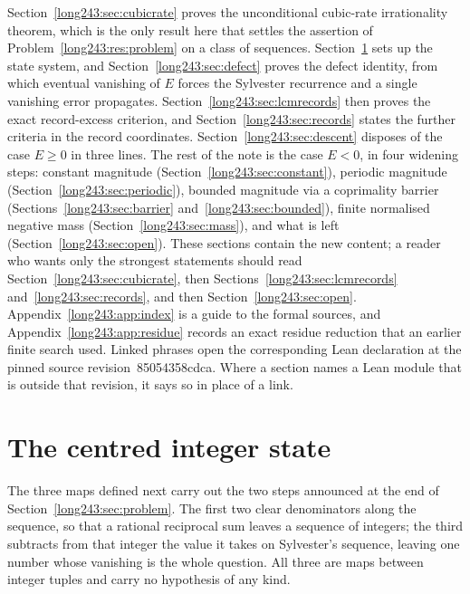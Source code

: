 \documentclass[11pt]{article}
\renewcommand{\commitshort}{85054358cdca}
\begin{document}
Section~\ref{long243:sec:cubicrate} proves the unconditional cubic-rate irrationality
theorem, which is the only result here that settles the assertion of
Problem~\ref{long243:res:problem} on a class of sequences.
Section~\ref{long243:sec:state} sets up the state system, and Section~\ref{long243:sec:defect}
proves the defect identity, from which eventual vanishing of $E$ forces the
Sylvester recurrence and a single vanishing error propagates.
Section~\ref{long243:sec:lcmrecords} then proves the exact record-excess criterion, and
Section~\ref{long243:sec:records} states the further criteria in the record
coordinates.  Section~\ref{long243:sec:descent} disposes of the case $E\ge0$ in three
lines.  The rest of the note is the case $E<0$, in four widening steps:
constant magnitude (Section~\ref{long243:sec:constant}), periodic magnitude
(Section~\ref{long243:sec:periodic}), bounded magnitude via a coprimality barrier
(Sections~\ref{long243:sec:barrier} and~\ref{long243:sec:bounded}), finite normalised negative
mass (Section~\ref{long243:sec:mass}), and what is left (Section~\ref{long243:sec:open}).
These sections contain the new content; a reader who wants only the strongest
statements should read Section~\ref{long243:sec:cubicrate}, then
Sections~\ref{long243:sec:lcmrecords} and~\ref{long243:sec:records}, and
then Section~\ref{long243:sec:open}.  Appendix~\ref{long243:app:index} is a guide to the formal
sources, and Appendix~\ref{long243:app:residue} records an exact residue reduction that
an earlier finite search used.  Linked phrases open the corresponding Lean
declaration at the pinned source revision~\commitshort.  Where a section names
a Lean module that is outside that revision, it says so in place of a link.

\section{The centred integer state}\label{long243:sec:state}

The three maps defined next carry out the two steps announced at the end of
Section~\ref{long243:sec:problem}.  The first two clear denominators along the
sequence, so that a rational reciprocal sum leaves a sequence of integers; the
third subtracts from that integer the value it takes on Sylvester's sequence,
leaving one number whose vanishing is the whole question.  All three are maps
between integer tuples and carry no hypothesis of any kind.
\end{document}
